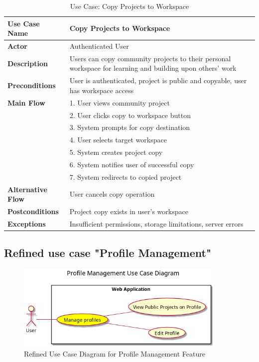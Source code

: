\begin{table}[H]
\centering
\caption{Use Case: Copy Projects to Workspace}
\begin{tabular}{|p{3cm}|p{10cm}|}
\hline
\textbf{Use Case Name} & Copy Projects to Workspace \\
\hline
\textbf{Actor} & Authenticated User \\
\hline
\textbf{Description} & Users can copy community projects to their personal workspace for learning and building upon others' work \\
\hline
\textbf{Preconditions} & User is authenticated, project is public and copyable, user has workspace access \\
\hline
\textbf{Main Flow} & 
1. User views community project \\
& 2. User clicks copy to workspace button \\
& 3. System prompts for copy destination \\
& 4. User selects target workspace \\
& 5. System creates project copy \\
& 6. System notifies user of successful copy \\
& 7. System redirects to copied project \\
\hline
\textbf{Alternative Flow} & User cancels copy operation \\
\hline
\textbf{Postconditions} & Project copy exists in user's workspace \\
\hline
\textbf{Exceptions} & Insufficient permissions, storage limitations, server errors \\
\hline
\end{tabular}
\end{table}

\subsection{Refined use case "Profile Management"}

\begin{figure}[H]
\centering
\includegraphics[width=0.9\textwidth]{conception/SprintV/use_case_diagrams/refined_use_case_feature_profiles .png}
\caption{Refined Use Case Diagram for Profile Management Feature}
\label{fig:profile_management_use_case}
\end{figure}

